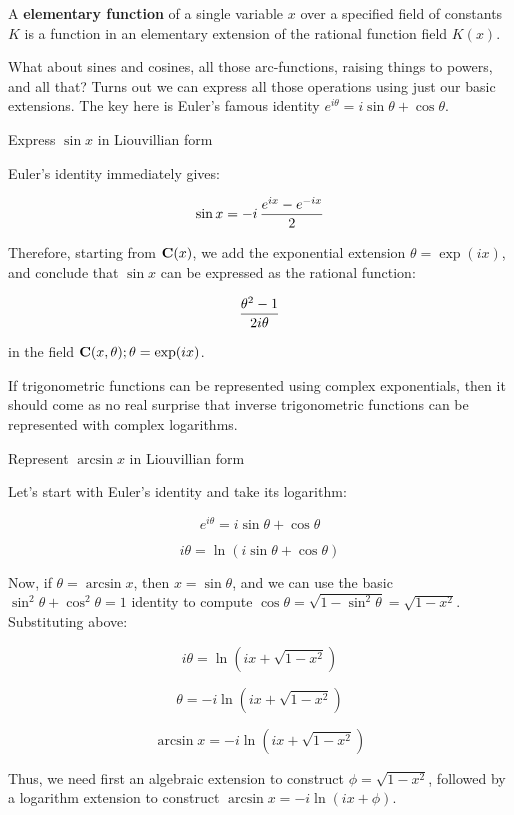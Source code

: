 \enddefinition


A {\bf elementary function} of a single variable $x$ over a specified
field of constants $K$ is a function in an elementary extension of the
rational function field $K(x)$.

\enddefinition

What about sines and cosines, all those arc-functions, raising things
to powers, and all that?  Turns out we can express all those
operations using just our basic extensions.  The key here is Euler's
famous identity $e^{i\theta}=i\sin\theta+\cos\theta$.

\example

Express $\sin x$ in Liouvillian form

Euler's identity immediately gives:

$$\sin x = {-i \,{{e^{ix} - e^{-ix}}\over 2}}$$

Therefore, starting from ${\bf C}(x)$,
we add the exponential extension $\theta = \exp(ix)$,
and conclude that $\sin x$ can be expressed as the rational function:

$${{\theta^2 - 1}\over 2i\theta}$$

in the field ${\bf C}(x,\theta); \theta=\exp(ix)$.

\endexample

If trigonometric functions can be represented using complex
exponentials, then it should come as no real surprise that inverse
trigonometric functions can be represented with complex logarithms.

\example Represent $\arcsin x$ in Liouvillian form

Let's start with Euler's identity and take its logarithm:

$$e^{i\theta}=i\sin\theta+\cos\theta$$

$$i\theta=\ln(i\sin\theta+\cos\theta)$$

Now, if $\theta = \arcsin x$, then $x = \sin \theta$, and we can use
the basic $\sin^2 \theta + \cos^2 \theta = 1$ identity to compute
$\cos \theta = \sqrt{1-\sin^2\theta} = \sqrt{1-x^2}$.  Substituting above:

$$i\theta=\ln(i x+\sqrt{1-x^2})$$

$$\theta=-i\ln(i x+\sqrt{1-x^2})$$

$$\arcsin x=-i\ln(i x+\sqrt{1-x^2})$$

Thus, we need first an algebraic extension to construct $\phi = \sqrt{1-x^2}$,
followed by a logarithm extension to construct $\arcsin x = -i\ln(ix+\phi)$.

